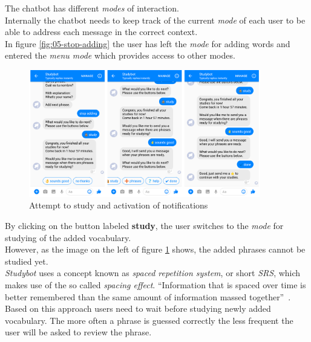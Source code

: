 The chatbot has different \emph{modes} of interaction.
\\
Internally the chatbot needs to keep track of the current \emph{mode} of each user to be able
to address each message in the correct context.
\\
In figure \ref{fig:05-stop-adding} the user has left the \emph{mode} for adding words
and entered the \emph{menu mode} which provides access to other modes.
\\

\begin{figure}[h]
  \centering
  \includegraphics[width=0.9\textwidth]{images/interface/06-enable-notify.png}
	\caption{Attempt to study and activation of notifications}
	\label{fig:06-enable-notify}
\end{figure}

By clicking on the button labeled \textbf{study},
the user switches to the \emph{mode} for studying of the added vocabulary.
\\
However, as the image on the left of figure \ref{fig:06-enable-notify} shows,
the added phrases cannot be studied yet.
\\

\emph{Studybot} uses a concept known as \emph{spaced repetition system}, or short \emph{SRS},
which makes use of the so called \emph{spacing effect}. ``Information that is spaced over time is better remembered than the same amount of information massed together''~\cite{srs}.
\\
Based on this approach users need to wait before studying newly added vocabulary.
The more often a phrase is guessed correctly the less frequent the user will be asked to review the phrase.
\\

